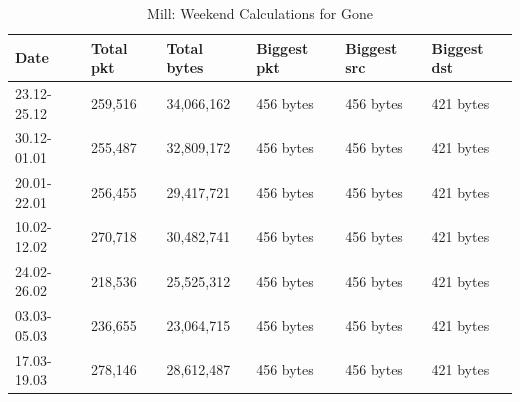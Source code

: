 \begin{table}[H]
    \caption{Mill: Weekend Calculations for Gone}
    \begin{tabular}{|l|l|l|l|l|l|}
        \hline
        \textbf{Date}    & \textbf{Total pkt} & \textbf{Total bytes} & \textbf{Biggest pkt} & \textbf{Biggest src} & \textbf{Biggest dst} \\ \hline
        23.12-25.12      & 259,516            & 34,066,162           & 456 bytes            & 456 bytes            & 421 bytes            \\ \hline
        30.12-01.01      & 255,487            & 32,809,172           & 456 bytes            & 456 bytes            & 421 bytes            \\ \hline
        20.01-22.01      & 256,455            & 29,417,721           & 456 bytes            & 456 bytes            & 421 bytes            \\ \hline
        10.02-12.02      & 270,718            & 30,482,741           & 456 bytes            & 456 bytes            & 421 bytes            \\ \hline
        24.02-26.02      & 218,536            & 25,525,312           & 456 bytes            & 456 bytes            & 421 bytes            \\ \hline
        03.03-05.03      & 236,655            & 23,064,715           & 456 bytes            & 456 bytes            & 421 bytes            \\ \hline
        17.03-19.03      & 278,146            & 28,612,487           & 456 bytes            & 456 bytes            & 421 bytes            \\ \hline
    \end{tabular}
    \label{tab:MillGoneWeekends}
\end{table}

